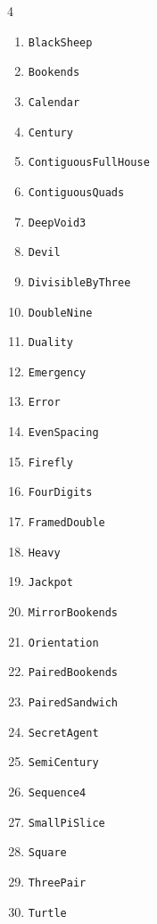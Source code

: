 \clearpage

\begin{multicols}4
    \begin{enumerate}
        \item \texttt{BlackSheep}
        \item \texttt{Bookends}
        \item \texttt{Calendar}
        \item \texttt{Century}
        \item {\footnotesize\texttt{ContiguousFullHouse}}\vphantom{a}
        \item \texttt{ContiguousQuads}
        \item \texttt{DeepVoid3}
        \item \texttt{Devil}
        \item \texttt{DivisibleByThree}
        \item \texttt{DoubleNine}
        \item \texttt{Duality}
        \item \texttt{Emergency}
        \item \texttt{Error}
        \item \texttt{EvenSpacing}
        \item \texttt{Firefly}
        \item \texttt{FourDigits}
        \item \texttt{FramedDouble}
        \item \texttt{Heavy}
        \item \texttt{Jackpot}
        \item \texttt{MirrorBookends}
        \item \texttt{Orientation}
        \item \texttt{PairedBookends}
        \item \texttt{PairedSandwich}
        \item \texttt{SecretAgent}
        \item \texttt{SemiCentury}
        \item \texttt{Sequence4}
        \item \texttt{SmallPiSlice}
        \item \texttt{Square}
        \item \texttt{ThreePair}
        \item \texttt{Turtle}
    \end{enumerate}
\end{multicols}


